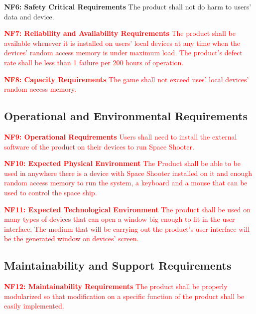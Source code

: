 \documentclass[12pt, titlepage]{article}
\begin{document}
\noindent \textbf{NF6: Safety Critical Requirements}
\newline
The product shall not do harm to users' data and device.
\newline


\noindent \textcolor{red}{\textbf{NF7: Reliability and Availability Requirements}
\newline
The product shall be available whenever it is installed on users' local devices at any time when the devices' random access memory is under maximum load. The product's defect rate shall be less than 1 failure per 200 hours of operation. }
\newline

\noindent \textcolor{red}{\textbf{NF8: Capacity Requirements}
\newline
The game shall not exceed uses' local devices' random access memory.}

\subsection{Operational and Environmental Requirements}

\noindent \textcolor{red}{\textbf{NF9: Operational Requirements}
\newline
Users shall need to install the external software of the product on their devices to run Space Shooter.}
\newline

\noindent \textcolor{red}{\textbf{NF10: Expected Physical Environment}
\newline
The Product shall be able to be used in anywhere there is a device with Space Shooter installed on it and enough random access memory to run the system, a keyboard and a mouse that can be used to control the space ship.
\newline}

\noindent \textcolor{red}{\textbf{NF11: Expected Technological Environment}
\newline
The product shall be used on many types of devices that can open a window big enough to fit in the user interface. The medium that will be carrying out the product's user interface will be the generated window on devices' screen. }

\subsection{Maintainability and Support Requirements}

\noindent \textcolor{red}{\textbf{NF12: Maintainability Requirements}
\newline
The product shall be properly modularized so that modification on a specific function of the product shall be easily implemented.}
\newline
\end{document}
